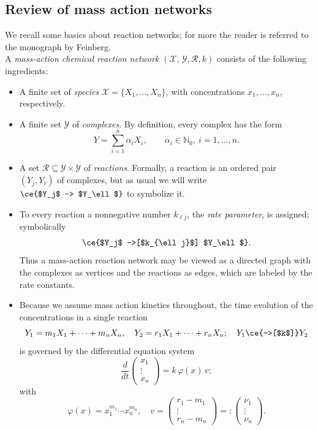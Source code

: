 \documentclass{article}
\begin{document}
\subsection{Review of mass action networks }
We recall some basics about reaction networks; for more the reader is referred to the monograph \cite{Fein} by Feinberg.\\
A {\em mass-action chemical reaction network} $({\mathcal X},\,{\mathcal Y},{\mathcal R}, k)$ consists of the following ingredients:
\begin{itemize}
\item A finite set of {\em species} $\mathcal{X}=\{X_1,\dots,X_n\}$, with concentrations $x_1,\ldots,x_n$, respectively.
\item A finite set $\mathcal Y$ of {\em complexes}. By definition, every complex has the form
\[
 Y=\sum_{i=1}^n \alpha_{i}X_i ,\qquad \alpha_i\in\mathbb N_0, \ i=1,\ldots,n.
\]
\item A set ${\mathcal R}\subseteq {\mathcal Y}\times {\mathcal Y}$ of {\em reactions}. Formally,  a reaction is an ordered pair $(Y_j,Y_\ell)$ of complexes, but as usual we will write 
$
\ce{$Y_j$ -> $Y_\ell$}
$
to symbolize it.
\item To every reaction a nonnegative number $k_{\ell j}$, the {\em rate parameter}, is assigned; symbolically
\[
\ce{$Y_j$  ->[$k_{\ell j}$] $Y_\ell$}.
\]
 Thus a mass-action reaction network may be viewed as a directed graph with the complexes as vertices and the reactions as edges, which are labeled by the rate constants.
\item Because we assume mass action kinetics throughout, the time evolution of the concentrations in a single reaction 
\begin{equation*}
Y_1=m_1X_1+\cdots+m_nX_n, \quad Y_2=r_1X_1+\cdots+r_nX_n; \quad Y_1 \ce {->[$k$]} Y_2
\end{equation*}
is governed by the differential equation system
\begin{equation}\label{singlereac}
\frac{d}{dt}\begin{pmatrix} x_1\\ \vdots\\ x_n\end{pmatrix}=k\,\varphi(x)\,v;
\end{equation}
with 
\begin{equation}\label{singlereacplus}
\varphi(x)=x_1^{m_1}\cdots x_n^{m_n},\quad v=\begin{pmatrix} r_1-m_1\\ \vdots\\ r_n-m_n\end{pmatrix}=:\begin{pmatrix}\nu_1\\ \vdots\\ \nu_n\end{pmatrix}.

\end{equation}
\end{itemize}
\end{document}

